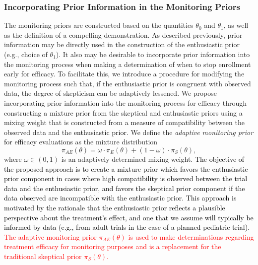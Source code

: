 \documentclass[12pt]{article}
\begin{document}
\subsubsection{Incorporating Prior Information in the Monitoring Priors}\label{sec:incorporating}
The monitoring priors are constructed based on the quantities $\theta_0$ and $\theta_1$, as well as the definition of a compelling demonstration. 
%
As described previously, prior information may be directly used in the construction of the enthusiastic prior (e.g., choice of $\theta_1$).
%
It also may be desirable to incorporate prior information into the monitoring process when making a determination of when to stop enrollment 
early for efficacy.
%
To facilitate this, we introduce a procedure for modifying the monitoring process such that, if the enthusiastic prior is congruent with observed data, the degree of skepticism can be adaptively lessened.
We propose incorporating prior information into the monitoring process for efficacy through constructing a mixture prior
from the skeptical and enthusiastic priors using a mixing weight that is constructed from \textcolor{black}{a measure} of compatibility between the
observed data and the \textcolor{black}{enthusiastic prior}. 
We define the \textit{adaptive monitoring prior} \textcolor{black}{for efficacy evaluations} as the mixture distribution	
\begin{equation}\label{eq:inference_prior}
	\pi_{AE}\left(\theta\right)=\omega\cdot\pi_E(\theta)+(1 - \omega)\cdot \pi_S(\theta),
\end{equation}
where $\omega\in(0,1)$ is an adaptively determined mixing weight. %
%
\textcolor{black}{The objective of the proposed approach is to create a mixture prior which favors the enthusiastic prior component in cases where high compatibility is observed between the trial data and the enthusiastic prior, and favors the skeptical prior component if the data observed are incompatible with the enthusiastic prior. This approach is motivated by the rationale that the enthusiastic prior reflects a plausible perspective about the treatment's effect, and one that we assume will typically be informed by data (e.g., from adult trials in the case of a planned pediatric trial).} \textcolor{red}{The adaptive monitoring prior $\pi_{AE}(\theta)$ is used to make determinations regarding treatment efficacy for monitoring purposes and is a replacement for the traditional skeptical prior $\pi_S(\theta)$.}
\end{document}

